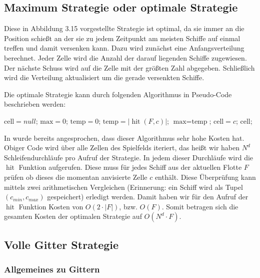 \documentclass[a4paper,12pt]{llncs}
\numberwithin{equation}{section}
\DeclareMathOperator{\hit}{hit}
\begin{document}
\subsection{Maximum Strategie oder optimale Strategie}

Diese in \cite{M13} Abbildung 3.15 vorgestellte Strategie ist optimal, da sie immer an die Position schießt an der sie zu jedem Zeitpunkt am meisten Schiffe auf einmal treffen und damit versenken kann. Dazu wird zunächst eine Anfangsverteilung berechnet. Jeder Zelle wird die Anzahl der darauf liegenden Schiffe zugewiesen. Der nächste Schuss wird auf die Zelle mit der größten Zahl abgegeben. Schließlich wird die Verteilung aktualisiert um die gerade versenkten Schiffe.

Die optimale Strategie kann durch folgenden Algorithmus in Pseudo-Code beschrieben werden:

\begin{tcolorbox}
	\begin{algorithmic}
		\State $\text{cell} = null$;
		\State $\text{max} = 0$;
		\State $\text{temp} = 0$;
		\State $\text{temp}=\left|\hit(F,c)\right|$;
		\State $\text{max}=\text{temp}$;
		\State $\text{cell} = c$;
		\EndIf
		\EndFor
		\State \Return $\text{cell}$;
		\EndFunction
	\end{algorithmic}
\end{tcolorbox}

In \cite{M13} wurde bereits angesprochen, dass dieser Algorithmus sehr hohe Kosten hat. Obiger Code wird über alle Zellen des Spielfelds iteriert, das heißt wir haben $N^d$ Schleifendurchläufe pro Aufruf der Strategie. In jedem dieser Durchläufe wird die $\hit$ Funktion aufgerufen. Diese muss für jedes Schiff aus der aktuellen Flotte $F$ prüfen ob dieses die momentan anvisierte Zelle $c$ enthält. Diese Überprüfung kann mittels zwei arithmetischen Vergleichen (Erinnerung: ein Schiff wird als Tupel $(c_{min},c_{max})$ gespeichert) erledigt werden. Damit haben wir für den Aufruf der $\hit$ Funktion Kosten von $O(2\cdot |F|)$, bzw. $O(F)$. Somit betragen sich die gesamten Kosten der optimalen Strategie auf $O(N^d\cdot F)$.
 

\subsection{Volle Gitter Strategie}

\subsubsection{Allgemeines zu Gittern}
\end{document}
